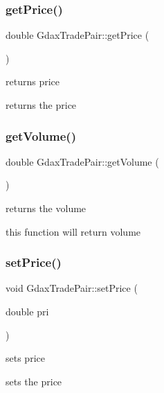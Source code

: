 \subsubsection{\texorpdfstring{get\+Price()}{getPrice()}}
{\footnotesize\ttfamily double Gdax\+Trade\+Pair\+::get\+Price (\begin{DoxyParamCaption}{ }\end{DoxyParamCaption})}



returns price 

returns the price \mbox{\label{class_gdax_trade_pair_ac1690b5bfce51854585ea1c9288250e6}} 
\subsubsection{\texorpdfstring{get\+Volume()}{getVolume()}}
{\footnotesize\ttfamily double Gdax\+Trade\+Pair\+::get\+Volume (\begin{DoxyParamCaption}{ }\end{DoxyParamCaption})}



returns the volume 

this function will return volume \mbox{\label{class_gdax_trade_pair_ad4e2b464d846c9800ea5f53f6cbdf4ba}} 
\subsubsection{\texorpdfstring{set\+Price()}{setPrice()}}
{\footnotesize\ttfamily void Gdax\+Trade\+Pair\+::set\+Price (\begin{DoxyParamCaption}\item[{double}]{pri }\end{DoxyParamCaption})}



sets price 

sets the price \mbox{\label{class_gdax_trade_pair_ac9fb00c66634690b9fbb5f2f4a457820}} 
